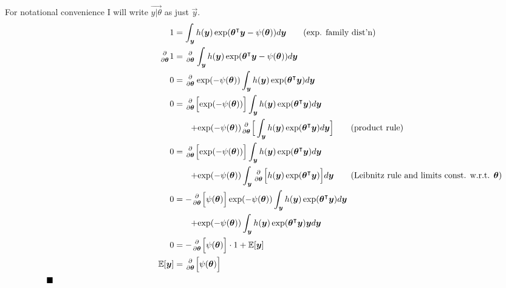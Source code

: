 
For notational convenience I will write $\vec{y\vert\theta}$ as just $\vec{y}$.
\begin{align*}
    1 &= \int_{\vec{y}} h(\vec{y})\exp(\vec{\theta}\tp\vec{y}-\psi(\vec{\theta}))d\vec{y} \tag*{(exp. family dist'n)}\\
    \partiald{}{\vec{\theta}}1 &= \partiald{}{\vec{\theta}}\int_{\vec{y}} h(\vec{y})\exp(\vec{\theta}\tp\vec{y}-\psi(\vec{\theta}))d\vec{y} \\
    0 &= \partiald{}{\vec{\theta}}\exp(-\psi(\vec{\theta}))\int_{\vec{y}} h(\vec{y})\exp(\vec{\theta}\tp\vec{y})d\vec{y}\\
    0 &= \partiald{}{\vec{\theta}}\Big[{\exp(-\psi(\vec{\theta}))}\Big]\int_{\vec{y}} h(\vec{y})\exp(\vec{\theta}\tp\vec{y})d\vec{y}\\
      &{\quad\quad+}{\exp(-\psi(\vec{\theta}))}\partiald{}{\vec{\theta}}\Big[\int_{\vec{y}} h(\vec{y})\exp(\vec{\theta}\tp\vec{y})d\vec{y}\Big]\tag*{(product rule)}\\
    0 &= \partiald{}{\vec{\theta}}\Big[{\exp(-\psi(\vec{\theta}))}\Big]\int_{\vec{y}} h(\vec{y})\exp(\vec{\theta}\tp\vec{y})d\vec{y}\\
      &{\quad\quad+}{\exp(-\psi(\vec{\theta}))}\int_{\vec{y}}\partiald{}{\vec{\theta}}\Big[ h(\vec{y})\exp(\vec{\theta}\tp\vec{y})\Big]d\vec{y}
                                                                                            \tag*{(Leibnitz rule and limits const. w.r.t. $\vec{\theta}$)}\\
    0 &= -\partiald{}{\vec{\theta}}{\Big[\psi(\vec{\theta})\Big]}\exp(-\psi(\vec{\theta}))\int_{\vec{y}} h(\vec{y})\exp(\vec{\theta}\tp\vec{y})d\vec{y}\\
      &{\quad\quad+}{\exp(-\psi(\vec{\theta}))}\int_{\vec{y}}h(\vec{y})\exp(\vec{\theta}\tp\vec{y})\vec{y}d\vec{y}\\
    0 &= -\partiald{}{\vec{\theta}}{\Big[\psi(\vec{\theta})\Big]}\cdot 1 + \expec{\vec{y}}\\
    \expec{\vec{y}} &= \partiald{}{\vec{\theta}}{\Big[\psi(\vec{\theta})\Big]} \\
    \tag*{$\blacksquare$\hspace{5cm}}
\end{align*}
